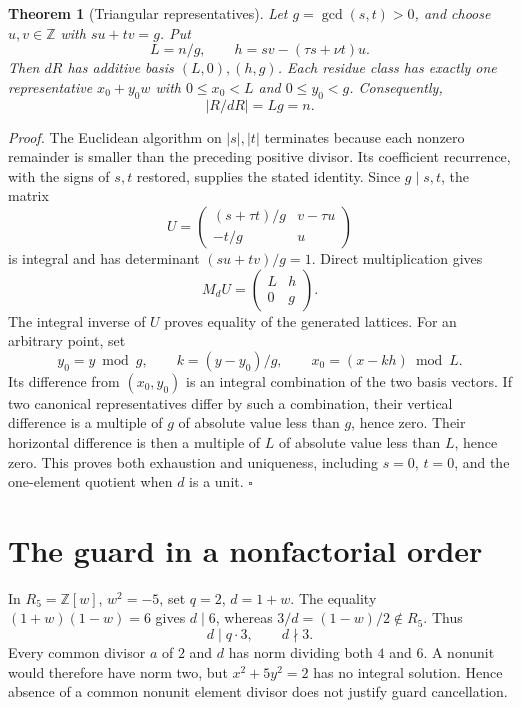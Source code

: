 \documentclass[11pt,letterpaper]{article}
\newcommand{\Z}{\mathbb{Z}}
\newtheorem{theorem}{Theorem}
\newenvironment{proof}{\noindent\textit{Proof.}}{\hfill\(\square\)}
\begin{document}
\begin{theorem}[Triangular representatives]
Let \(g=\gcd(s,t)>0\), and choose \(u,v\in\Z\) with \(su+tv=g\).
Put
\[
L=n/g,\qquad h=sv-(\tau s+\nu t)u.
\]
Then \(dR\) has additive basis \((L,0),(h,g)\). Each residue class has
exactly one representative \(x_0+y_0w\) with
\(0\le x_0<L\) and \(0\le y_0<g\). Consequently,
\[
|R/dR|=Lg=n.
\]
\end{theorem}
\begin{proof}
The Euclidean algorithm on \(|s|,|t|\) terminates because each nonzero
remainder is smaller than the preceding positive divisor. Its
coefficient recurrence, with the signs of \(s,t\) restored, supplies
the stated identity. Since \(g\mid s,t\), the matrix
\[
U=\begin{pmatrix}(s+\tau t)/g&v-\tau u\\-t/g&u\end{pmatrix}
\]
is integral and has determinant \((su+tv)/g=1\). Direct multiplication gives
\[
M_dU=\begin{pmatrix}L&h\\0&g\end{pmatrix}.
\]
The integral inverse of \(U\) proves equality of the generated lattices.
For an arbitrary point, set
\[
y_0=y\bmod g,\qquad k=(y-y_0)/g,\qquad
x_0=(x-kh)\bmod L.
\]
Its difference from \((x_0,y_0)\) is an integral combination of the two
basis vectors. If two canonical representatives differ by such a
combination, their vertical difference is a multiple of \(g\) of
absolute value less than \(g\), hence zero. Their horizontal difference
is then a multiple of \(L\) of absolute value less than \(L\), hence zero.
This proves both exhaustion and uniqueness, including \(s=0\), \(t=0\),
and the one-element quotient when \(d\) is a unit.
\end{proof}

\section{The guard in a nonfactorial order}

In \(R_5=\Z[w]\), \(w^2=-5\), set \(q=2\), \(d=1+w\).
The equality \((1+w)(1-w)=6\) gives \(d\mid6\), whereas
\(3/d=(1-w)/2\notin R_5\). Thus
\[
d\mid q\cdot3,\qquad d\nmid3.
\]
Every common divisor \(a\) of \(2\) and \(d\) has norm dividing both
\(4\) and \(6\). A nonunit would therefore have norm two, but
\(x^2+5y^2=2\) has no integral solution. Hence absence of a common
nonunit element divisor does not justify guard cancellation.
\end{document}
